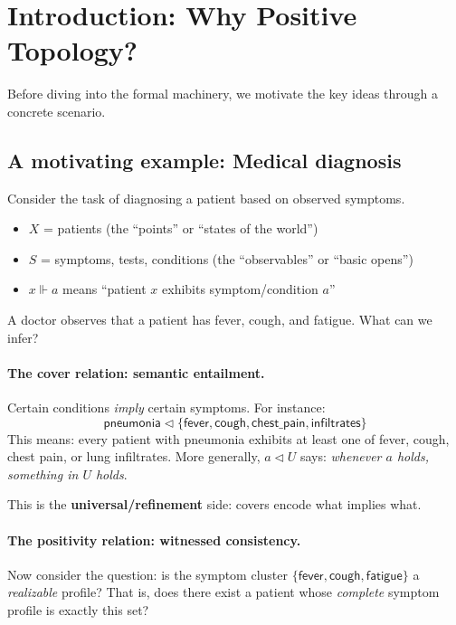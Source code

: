 \documentclass[11pt]{article}
\theoremstyle{definition}
\theoremstyle{plain}
\newcommand{\forces}{\Vdash}
\newcommand{\covers}{\triangleleft}
\begin{document}
\tableofcontents

\section{Introduction: Why Positive Topology?}

Before diving into the formal machinery, we motivate the key ideas through a concrete scenario.

\subsection{A motivating example: Medical diagnosis}

Consider the task of diagnosing a patient based on observed symptoms.

\begin{itemize}
  \item $X$ = patients (the ``points'' or ``states of the world'')
  \item $S$ = symptoms, tests, conditions (the ``observables'' or ``basic opens'')
  \item $x \forces a$ means ``patient $x$ exhibits symptom/condition $a$''
\end{itemize}

A doctor observes that a patient has fever, cough, and fatigue. What can we infer?

\paragraph{The cover relation: semantic entailment.}
Certain conditions \emph{imply} certain symptoms. For instance:
\[
\mathsf{pneumonia} \covers \{\mathsf{fever}, \mathsf{cough}, \mathsf{chest\_pain}, \mathsf{infiltrates}\}
\]
This means: every patient with pneumonia exhibits at least one of fever, cough, chest pain, or lung infiltrates.
More generally, $a \covers U$ says: \emph{whenever $a$ holds, something in $U$ holds}.

This is the \textbf{universal/refinement} side: covers encode what implies what.

\paragraph{The positivity relation: witnessed consistency.}
Now consider the question: is the symptom cluster $\{\mathsf{fever}, \mathsf{cough}, \mathsf{fatigue}\}$ a \emph{realizable} profile?
That is, does there exist a patient whose \emph{complete} symptom profile is exactly this set?
\end{document}
